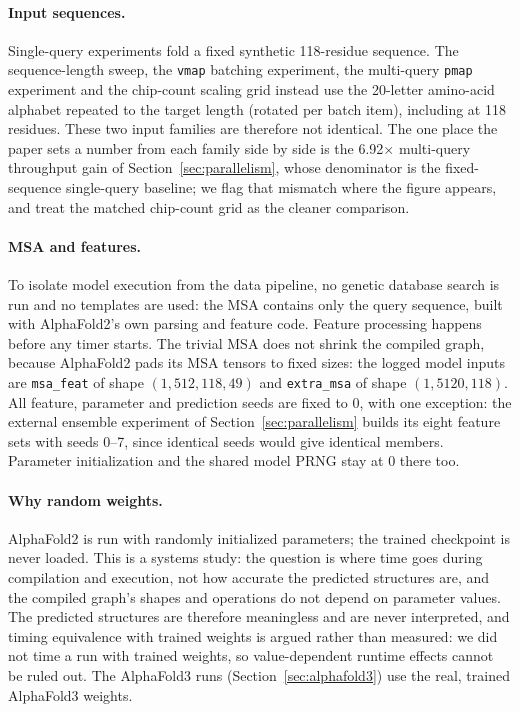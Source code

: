 \paragraph{Input sequences.} Single-query experiments fold a fixed
synthetic 118-residue sequence. The sequence-length sweep, the
\texttt{vmap} batching experiment, the multi-query \texttt{pmap}
experiment and the chip-count scaling grid instead use the 20-letter
amino-acid alphabet repeated to the target length (rotated per batch
item), including at 118 residues. These two input families are
therefore not identical. The one place the paper sets a number from
each family side by side is the 6.92$\times$ multi-query throughput
gain of Section~\ref{sec:parallelism}, whose denominator is the
fixed-sequence single-query baseline; we flag that mismatch where the
figure appears, and treat the matched chip-count grid as the cleaner
comparison.

\paragraph{MSA and features.} To isolate model execution from the data
pipeline, no genetic database search is run and no templates are used:
the MSA contains only the query sequence, built with AlphaFold2's own
parsing and feature code. Feature processing happens before any timer
starts. The trivial MSA does not shrink the compiled graph, because
AlphaFold2 pads its MSA tensors to fixed sizes: the logged model inputs
are \texttt{msa\_feat} of shape $(1, 512, 118, 49)$ and
\texttt{extra\_msa} of shape $(1, 5120, 118)$. All feature, parameter
and prediction seeds are fixed to 0, with one exception: the external
ensemble experiment of Section~\ref{sec:parallelism} builds its eight
feature sets with seeds 0--7, since identical seeds would give
identical members. Parameter initialization and the shared model PRNG
stay at 0 there too.

\paragraph{Why random weights.} AlphaFold2 is run with randomly
initialized parameters; the trained checkpoint is never loaded. This is a
systems study: the question is where time goes during compilation and
execution, not how accurate the predicted structures are, and the
compiled graph's shapes and operations do not depend on parameter
values. The predicted structures are therefore meaningless and are
never interpreted, and timing equivalence with trained weights is
argued rather than measured: we did not time a run with trained
weights, so value-dependent runtime effects cannot be ruled out.
The AlphaFold3 runs (Section~\ref{sec:alphafold3}) use the real, trained
AlphaFold3 weights.

